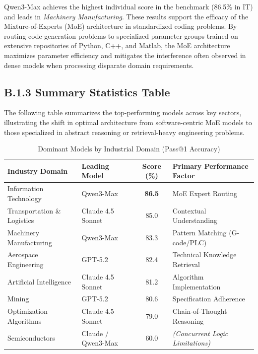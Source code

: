\documentclass{article}
\theoremstyle{plain}
\theoremstyle{definition}
\theoremstyle{remark}
\begin{document}
Qwen3-Max achieves the highest individual score in the benchmark (86.5\% in IT) and leads in \textit{Machinery Manufacturing}. These results support the efficacy of the Mixture-of-Experts (MoE) architecture in standardized coding problems. By routing code-generation problems to specialized parameter groups trained on extensive repositories of Python, C++, and Matlab, the MoE architecture maximizes parameter efficiency and mitigates the interference often observed in dense models when processing disparate domain requirements.


\subsection*{B.1.3 Summary Statistics Table}

The following table summarizes the top-performing models across key sectors, illustrating the shift in optimal architecture from software-centric MoE models to those specialized in abstract reasoning or retrieval-heavy engineering problems.

\begin{table}[h!]
\centering
\caption{Dominant Models by Industrial Domain (Pass@1 Accuracy)}
\label{tab:industry_performance}
\begin{tabular}{@{}llcl@{}}
\toprule
\textbf{Industry Domain} & \textbf{Leading Model} & \textbf{Score (\%)} & \textbf{Primary Performance Factor} \\ \midrule
Information Technology & Qwen3-Max & \textbf{86.5} & MoE Expert Routing \\
Transportation \& Logistics & Claude 4.5 Sonnet & 85.0 & Contextual Understanding \\
Machinery Manufacturing & Qwen3-Max & 83.3 & Pattern Matching (G-code/PLC) \\
Aerospace Engineering & GPT-5.2 & 82.4 & Technical Knowledge Retrieval \\
Artificial Intelligence & Claude 4.5 Sonnet & 81.2 & Algorithm Implementation \\
Mining & GPT-5.2 & 80.6 & Specification Adherence \\
Optimization Algorithms & Claude 4.5 Sonnet & 79.0 & Chain-of-Thought Reasoning \\
Semiconductors & Claude / Qwen3-Max & 60.0 & \textit{(Concurrent Logic Limitations)} \\
\bottomrule
\end{tabular}
\end{table}
\end{document}

